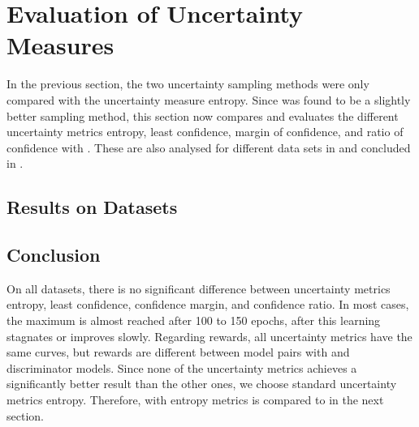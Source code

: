 \section{Evaluation of Uncertainty Measures}
\label{ch:evaluation:sec:evaluation_metrics}
%
In the previous section, the two uncertainty sampling methods were only compared with the uncertainty measure entropy.
Since \ussoftmax was found to be a slightly better sampling method, this section now compares and evaluates the different uncertainty metrics entropy, least confidence, margin of confidence, and ratio of confidence with \ussoftmax. 
These are also analysed for different data sets in  and concluded in .
%
\subsection{Results on Datasets} \label{subsec:measures_results}








\subsection{Conclusion}
\label{subsec:measure_conclusion}
On all datasets, there is no significant difference between uncertainty metrics entropy, least confidence, confidence margin, and confidence ratio.
In most cases, the maximum is almost reached after 100 to 150 epochs, after this learning stagnates or improves slowly.
Regarding rewards, all uncertainty metrics have the same curves, but rewards are different between model pairs with \transe and \transe discriminator models.
Since none of the uncertainty metrics achieves a significantly better result than the other ones, we choose standard uncertainty metrics entropy.
Therefore, \ussoftmax with entropy metrics is compared to \origsampling in the next section.